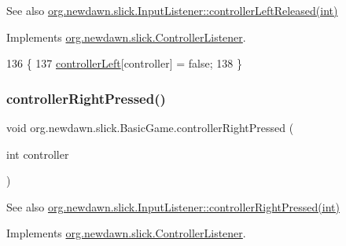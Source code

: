 \begin{DoxySeeAlso}{See also}
\mbox{\hyperlink{interfaceorg_1_1newdawn_1_1slick_1_1_controller_listener_ad2f898f0efe21771a0d9568c454dea0d}{org.\+newdawn.\+slick.\+Input\+Listener\+::controller\+Left\+Released(int)}} 
\end{DoxySeeAlso}


Implements \mbox{\hyperlink{interfaceorg_1_1newdawn_1_1slick_1_1_controller_listener_ad2f898f0efe21771a0d9568c454dea0d}{org.\+newdawn.\+slick.\+Controller\+Listener}}.


\begin{DoxyCode}
136                                                        \{
137         \mbox{\hyperlink{classorg_1_1newdawn_1_1slick_1_1_basic_game_ab9942a3607c7c1bb9f68c7f49514edb6}{controllerLeft}}[controller] = \textcolor{keyword}{false};
138     \}
\end{DoxyCode}
\mbox{\label{classorg_1_1newdawn_1_1slick_1_1_basic_game_a8c225d55800c95a5b339468d08fcf48c}} 
\subsubsection{\texorpdfstring{controller\+Right\+Pressed()}{controllerRightPressed()}}
{\footnotesize\ttfamily void org.\+newdawn.\+slick.\+Basic\+Game.\+controller\+Right\+Pressed (\begin{DoxyParamCaption}\item[{int}]{controller }\end{DoxyParamCaption})\hspace{0.3cm}{\ttfamily [inline]}}

\begin{DoxySeeAlso}{See also}
\mbox{\hyperlink{interfaceorg_1_1newdawn_1_1slick_1_1_controller_listener_ae4ac64996df9778c4987705275792780}{org.\+newdawn.\+slick.\+Input\+Listener\+::controller\+Right\+Pressed(int)}} 
\end{DoxySeeAlso}


Implements \mbox{\hyperlink{interfaceorg_1_1newdawn_1_1slick_1_1_controller_listener_ae4ac64996df9778c4987705275792780}{org.\+newdawn.\+slick.\+Controller\+Listener}}.


